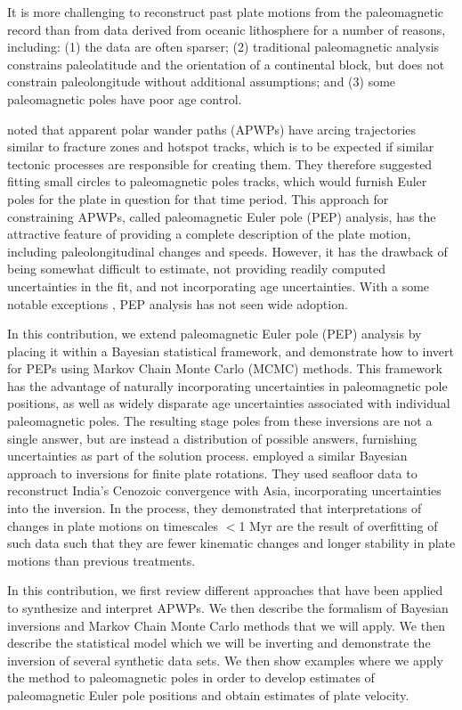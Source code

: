 \documentclass[11pt,letterpaper]{article}
\begin{document}
It is more challenging to reconstruct past plate motions from the paleomagnetic record than from data derived from oceanic lithosphere for a number of reasons, including: (1) the data are often sparser; (2) traditional paleomagnetic analysis constrains paleolatitude and the orientation of a continental block, but does not constrain paleolongitude without additional assumptions; and (3) some paleomagnetic poles have poor age control.

\citet{Gordon1984a} noted that apparent polar wander paths (APWPs) have arcing trajectories similar to fracture zones and hotspot tracks, which is to be expected if similar tectonic processes are responsible for creating them. They therefore suggested fitting small circles to paleomagnetic poles tracks, which would furnish Euler poles for the plate in question for that time period. This approach for constraining APWPs, called paleomagnetic Euler pole (PEP) analysis, has the attractive feature of providing a complete description of the plate motion, including paleolongitudinal changes and speeds.  However, it has the drawback of being somewhat difficult to estimate, not providing readily computed uncertainties in the fit, and not incorporating age uncertainties. With a some notable exceptions \citep[e.g.][]{Bryan1986a, Beck1989a, Tarling1996a,  Beck2003a, Smirnov2010a}, PEP analysis has not seen wide adoption.

In this contribution, we extend paleomagnetic Euler pole (PEP) analysis by placing it within a Bayesian statistical framework, and demonstrate how to invert for PEPs using Markov Chain Monte Carlo (MCMC) methods. This framework has the advantage of naturally incorporating uncertainties in paleomagnetic pole positions, as well as widely disparate age uncertainties associated with individual paleomagnetic poles. The resulting stage poles from these inversions are not a single answer, but are instead a distribution of possible answers, furnishing uncertainties as part of the solution process. \citet{Iaffaldano2012a} employed a similar Bayesian approach to inversions for finite plate rotations. They used seafloor data to reconstruct India's Cenozoic convergence with Asia, incorporating uncertainties into the inversion. In the process, they demonstrated that interpretations of changes in plate motions on timescales $<$1 Myr are the result of overfitting of such data such that they are fewer kinematic changes and longer stability in plate motions than previous treatments.

In this contribution, we first review different approaches that have been applied to synthesize and interpret APWPs. We then describe the formalism of Bayesian inversions and Markov Chain Monte Carlo methods that we will apply. We then describe the statistical model which we will be inverting and demonstrate the inversion of several synthetic data sets. We then show examples where we apply the method to paleomagnetic poles in order to develop estimates of paleomagnetic Euler pole positions and obtain estimates of plate velocity.
\end{document}
